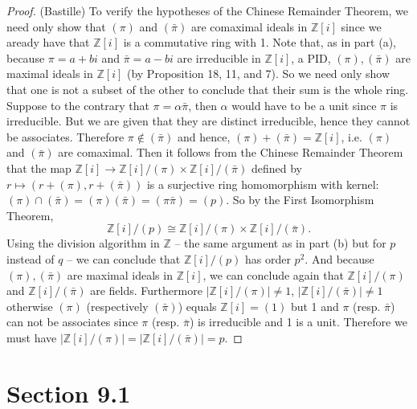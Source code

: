 \documentclass[10pt]{article}
\newcommand{\Z}{\mathbb{Z}}
\begin{document}
\begin{itemize}
\begin{enumerate}
\begin{proof} (Bastille) To verify the hypotheses of the Chinese Remainder Theorem, we need only show that $(\pi)$ and $(\bar{\pi})$ are comaximal ideals in $\Z[i]$ since we aready have that $\Z[i]$ is a commutative ring with 1. Note that, as in part (a), because $\pi=a+bi$ and $\bar{\pi}=a-bi$ are irreducible in $\Z[i]$, a PID, $(\pi), (\bar{\pi})$ are maximal ideals in $\Z[i]$ (by Proposition 18, 11, and 7). So we need only show that one is not a subset of the other to conclude that their sum is the whole ring. Suppose to the contrary that $\pi=\alpha\bar{\pi}$, then $\alpha$ would have to be a unit since $\pi$ is irreducible. But we are given that they are distinct irreducible, hence they cannot be associates. Therefore $\pi \notin (\bar{\pi})$ and hence, $(\pi)+(\bar{\pi})=\Z[i]$, i.e. $(\pi)$ and $(\bar{\pi})$ are comaximal. Then it follows from the Chinese Remainder Theorem that the map  $\Z[i] \to \Z[i]/(\pi)\times \Z[i]/(\bar{\pi})$ defined by $r \longmapsto (r+(\pi), r+(\bar{\pi}))$ is a surjective ring homomorphism with kernel: $(\pi)\cap (\bar{\pi})=(\pi)(\bar{\pi})=(\pi \bar{\pi})=(p)$. So by the First Isomorphism Theorem,
$$ \Z[i]/(p) \cong \Z[i]/(\pi)\times \Z[i]/(\bar{\pi}).$$
Using the division algorithm in $\Z$ -- the same argument as in part
(b) but for $p$ instead of $q$ -- we can conclude that $\Z[i]/(p)$
has order $p^2$. And because $(\pi), (\bar{\pi})$ are maximal ideals
in $\Z[i]$, we can conclude again that $\Z[i]/(\pi)$ and
$\Z[i]/(\bar{\pi})$ are fields. Furthermore
$\left|\Z[i]/(\pi)\right| \neq 1$, $\left|\Z[i]/(\bar{\pi})\right|
\neq 1$ otherwise $(\pi)$ (respectively $(\bar{\pi})$) equals
$\Z[i]=(1)$ but 1 and $\pi$ (resp. $\bar{\pi}$) can not be
associates since $\pi$ (resp. $\bar{\pi}$) is irreducible and 1 is a
unit. Therefore we must have
$\left|\Z[i]/(\pi)\right|=\left|\Z[i]/(\bar{\pi})\right|=p$.
\end{proof}
\end{enumerate}
\end{itemize}

\section*{Section 9.1}
\end{document}
